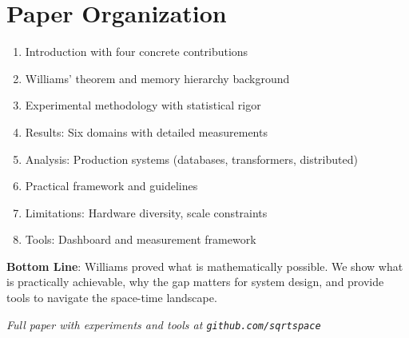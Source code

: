 \documentclass[11pt,twocolumn]{article}
\begin{document}
\section{Paper Organization}
\begin{enumerate}
\item Introduction with four concrete contributions
\item Williams' theorem and memory hierarchy background
\item Experimental methodology with statistical rigor
\item Results: Six domains with detailed measurements
\item Analysis: Production systems (databases, transformers, distributed)
\item Practical framework and guidelines
\item Limitations: Hardware diversity, scale constraints
\item Tools: Dashboard and measurement framework
\end{enumerate}

\vspace{3mm}
\noindent\textbf{Bottom Line}: Williams proved what is mathematically possible. We show what is practically achievable, why the gap matters for system design, and provide tools to navigate the space-time landscape.

\vspace{3mm}
\noindent\textit{Full paper with experiments and tools at \texttt{github.com/sqrtspace}}
\end{document}
